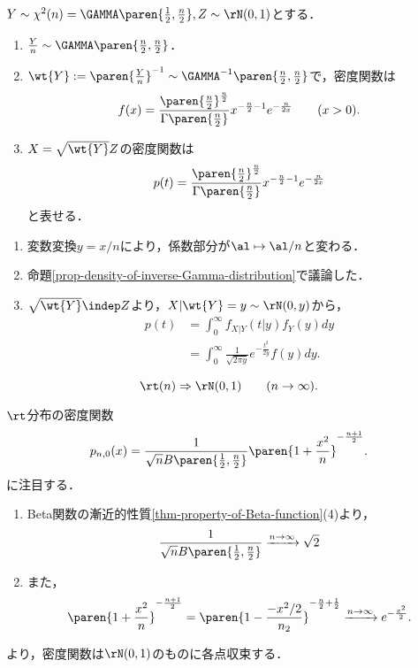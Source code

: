 \documentclass[uplatex,dvipdfmx]{jsreport}
\begin{document}
\begin{proposition}[逆Gamma分布の正規混合の構造]
    $Y\sim\chi^2(n)=\GAMMA\paren{\frac{1}{2},\frac{n}{2}},Z\sim\rN(0,1)$とする．
    \begin{enumerate}
        \item $\frac{Y}{n}\sim\GAMMA\paren{\frac{n}{2},\frac{n}{2}}$．
        \item $\wt{Y}:=\paren{\frac{Y}{n}}^{-1}\sim\GAMMA^{-1}\paren{\frac{n}{2},\frac{n}{2}}$で，密度関数は
        \[f(x)=\frac{\paren{\frac{n}{2}}^{\frac{n}{2}}}{\Gamma\paren{\frac{n}{2}}}x^{-\frac{n}{2}-1}e^{-\frac{n}{2x}}\qquad(x>0).\]
        \item $X=\sqrt{\wt{Y}}Z$の密度関数は
        \[p(t)=\frac{\paren{\frac{n}{2}}^{\frac{n}{2}}}{\Gamma\paren{\frac{n}{2}}}x^{-\frac{n}{2}-1}e^{-\frac{n}{2x}}\]
        と表せる．
    \end{enumerate}
\end{proposition}
\begin{Proof}\mbox{}
    \begin{enumerate}
        \item 変数変換$y=x/n$により，係数部分が$\al\mapsto\al/n$と変わる．
        \item 命題\ref{prop-density-of-inverse-Gamma-distribution}で議論した．
        \item $\sqrt{\wt{Y}}\indep Z$より，$X|\wt{Y}=y\sim\rN(0,y)$から，
        \begin{align*}
            p(t)&=\int_0^\infty f_{X|Y}(t|y)f_Y(y)dy\\
            &=\int^\infty_0\frac{1}{\sqrt{2\pi y}}e^{-\frac{t^2}{2y}}f(y)dy.
        \end{align*}
    \end{enumerate}
\end{Proof}

\begin{corollary}[t-分布の漸近的性質]
    \[\rt(n)\Rightarrow\rN(0,1)\qquad(n\to\infty).\]
\end{corollary}
\begin{Proof}
    $\rt$分布の密度関数
    \[p_{n,0}(x)=\frac{1}{\sqrt{n}B\paren{\frac{1}{2},\frac{n}{2}}}\paren{1+\frac{x^2}{n}}^{-\frac{n+1}{2}}.\]
    に注目する．
    \begin{enumerate}
        \item Beta関数の漸近的性質\ref{thm-property-of-Beta-function}(4)より，
        \[\frac{1}{\sqrt{n}B\paren{\frac{1}{2},\frac{n}{2}}}\xrightarrow{n\to\infty}\sqrt{2}\]
        \item また，
        \[\paren{1+\frac{x^2}{n}}^{-\frac{n+1}{2}}=\paren{1-\frac{-x^2/2}{n_2}}^{-\frac{n}{2}+\frac{1}{2}}\xrightarrow{n\to\infty}e^{-\frac{x^2}{2}}.\]
    \end{enumerate}
    より，密度関数は$\rN(0,1)$のものに各点収束する．
\end{Proof}
\end{document}
